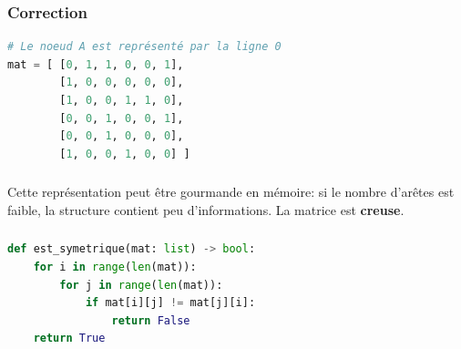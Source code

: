 \documentclass[svgnames,11pt]{beamer}
\begin{document}
\begin{frame}[fragile]
    \frametitle{Correction}
    \begin{center}
    \end{center}
    \begin{center}
        \begin{lstlisting}[language=Python , basicstyle=\ttfamily\small, xleftmargin=2em, xrightmargin=2em]
# Le noeud A est représenté par la ligne 0
mat = [ [0, 1, 1, 0, 0, 1],
        [1, 0, 0, 0, 0, 0],
        [1, 0, 0, 1, 1, 0],
        [0, 0, 1, 0, 0, 1],
        [0, 0, 1, 0, 0, 0],
        [1, 0, 0, 1, 0, 0] ]
\end{lstlisting}
        \label{CODE}
    \end{center}

\end{frame}
\begin{frame}
    \frametitle{}

    \begin{aretenir}[Observation]
        Cette représentation peut être gourmande en mémoire: si le nombre d'arêtes est faible, la structure contient peu d'informations. La matrice est \textbf{creuse}.
    \end{aretenir}

\end{frame}
\begin{frame}[fragile]
    \frametitle{}

\begin{center}
\begin{lstlisting}[language=Python , basicstyle=\ttfamily\small, xleftmargin=2em, xrightmargin=2em]
def est_symetrique(mat: list) -> bool:
    for i in range(len(mat)):
        for j in range(len(mat)):
            if mat[i][j] != mat[j][i]:
                return False
    return True
\end{lstlisting}
\end{center}

\end{frame}
\end{document}
